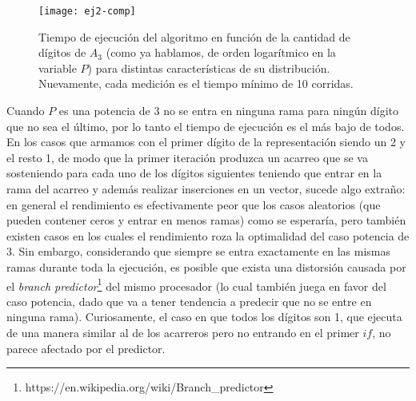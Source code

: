 	\begin{figure}[H]
	    \centering
	    \texttt{[image: ej2-comp]}
	    \caption{Tiempo de ejecución del algoritmo en función de la cantidad de dígitos de $A_3$ (como ya hablamos, de orden logarítmico en la variable $P$) para distintas características de su distribución. Nuevamente, cada medición es el tiempo mínimo de 10 corridas.}
	    \label{fig:ej2-comp}
	\end{figure}

	Cuando $P$ es una potencia de 3 no se entra en ninguna rama para ningún dígito que no sea el último, por lo tanto el tiempo de ejecución es el más bajo de todos. En los casos que armamos con el primer dígito de la representación siendo un 2 y el resto 1, de modo que la primer iteración produzca un acarreo que se va sosteniendo para cada uno de los dígitos siguientes teniendo que entrar en la rama del acarreo y además realizar inserciones en un vector, sucede algo extraño: en general el rendimiento es efectivamente peor que los casos aleatorios (que pueden contener ceros y entrar en menos ramas) como se esperaría, pero también existen casos en los cuales el rendimiento roza la optimalidad del caso potencia de 3. Sin embargo, considerando que siempre se entra exactamente en las mismas ramas durante toda la ejecución, es posible que exista una distorsión causada por el \emph{branch predictor}\footnote{https://en.wikipedia.org/wiki/Branch_predictor} del mismo procesador (lo cual también juega en favor del caso potencia, dado que va a tener tendencia a predecir que no se entre en ninguna rama). Curiosamente, el caso en que todos los dígitos son 1, que ejecuta de una manera similar al de los acarreros pero no entrando en el primer $if$, no parece afectado por el predictor.
